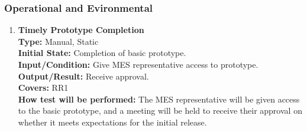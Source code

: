 \documentclass[12pt, titlepage]{article}
\begin{document}
\subsubsection{Operational and Evironmental}
\begin{enumerate}[label=\bfseries OE-\arabic*:, wide=0pt]
  \item \label{test-OE1} \textbf{Timely Prototype Completion}\\[2mm]
    {\bf Type:} Manual, Static\\
    {\bf Initial State:} Completion of basic prototype.\\
    {\bf Input/Condition:} Give MES representative access to prototype.\\
    {\bf Output/Result:} Receive approval.\\
    {\bf Covers:} RR1\\
    {\bf How test will be performed:} The MES representative will be given access to the basic prototype, and a meeting will be held to receive their approval on whether it meets expectations for the initial release.
\end{enumerate}
\end{document}
